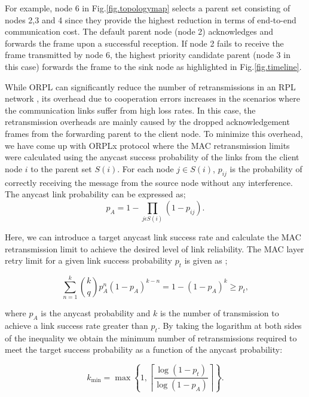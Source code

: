 \documentclass[conference]{IEEEtran}
\begin{document}
For example, node 6 in Fig.\ref{fig.topologymap} selects a parent set consisting of nodes 2,3 and 4 since they provide the highest reduction in terms of end-to-end communication cost. The default parent node (node 2) acknowledges and forwards the frame upon a successful reception. If node 2 fails to receive the frame transmitted by node 6, the highest priority candidate parent (node 3 in this case) forwards the frame to the sink node as highlighted in Fig.\ref{fig.timeline}.   

While ORPL can significantly reduce the number of retransmissions in an RPL network \cite{orpl}, its overhead due to cooperation errors increases in the scenarios where the communication links suffer from high loss rates. In this case, the retransmission overheads are mainly caused by the dropped acknowledgement frames from the forwarding parent to the client node. To minimize this overhead, we have come up with ORPLx \cite{orpl-tpds} protocol where the MAC retransmission limits were calculated using the anycast success probability of the links from the client node $i$ to the parent set $S(i)$. For each node $j\in S(i)$, $p_{ij}$ is the probability of correctly receiving the message from the source node without any interference. The anycast link probability can be expressed as;
\begin{equation}
    p_A = 1-\prod_{j \epsilon S(i)}(1-p_{ij}). \label{eq:pA}
\end{equation}

Here, we can introduce a target anycast link success rate and calculate the MAC retransmission limit to achieve the desired level of link reliability. The MAC layer retry limit for a given link success probability $p_t$ is given as \cite{orpl-tpds}; 

\begin{equation}
\sum_{n=1}^{k}{{k\choose q} p_A^n (1-p_A)^{k-n}} = 1- (1-p_A)^k \geq
p_t, \label{eq:1}
\end{equation}

where $p_A$ is the anycast probability and $k$ is the number of transmission to achieve a link success rate greater than $p_t$. By taking the logarithm at both sides
of the inequality we obtain the minimum number of retransmissions
required to meet the target success probability as a function of the
anycast probability:

\begin{equation}
k_{\textrm{min}}=\max\left\{1,\left\lceil\frac{\log(1-p_t)}{\log(1-p_A)}\right\rceil\right\}.
\label{eq:kmin}
\end{equation}
\end{document}
